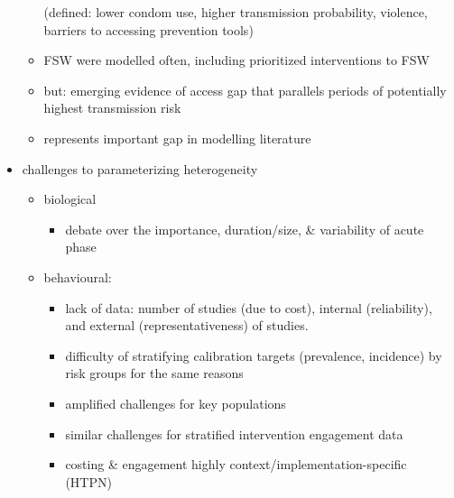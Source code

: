 \begin{itemize}
\begin{itemize}
          (defined: lower condom use, higher transmission probability, violence, barriers to accessing prevention tools)
    \item FSW were modelled often, including prioritized interventions to FSW
    \item but: emerging evidence of access gap that parallels periods of potentially highest transmission risk
    \item represents important gap in modelling literature
  \end{itemize}
  \item challenges to parameterizing heterogeneity
  \begin{itemize}
    \item biological
    \begin{itemize}
      \item debate over the importance, duration/size, \& variability of acute phase
    \end{itemize}
    \item behavioural:
    \begin{itemize}
      \item lack of data:
            number of studies (due to cost),
            internal (reliability),
            and external (representativeness) of studies.
      \item difficulty of stratifying calibration targets (prevalence, incidence)
            by risk groups for the same reasons
      \item amplified challenges for key populations
    \end{itemize}
    \begin{itemize}
      \item similar challenges for stratified intervention engagement data
      \item costing \& engagement highly context/implementation-specific (HTPN)
    \end{itemize}
  \end{itemize}
\end{itemize}
